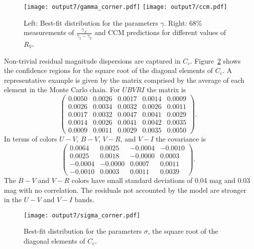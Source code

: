 \documentclass[11pt, oneside]{article}   	%
\begin{document}
\begin{figure}[htbp] %
   \centering
   \texttt{[image: output7/gamma\_corner.pdf]} 
   \texttt{[image: output7/ccm.pdf]} 
   \caption{Left: Best-fit distribution for the parameters $\gamma$.  Right: 68\% measurements of $\frac{\gamma_X}{\gamma_1-\gamma_2}$ and CCM
   predictions for different values of $R_V$.}
   \label{gamma:fig}
\end{figure}

Non-trivial residual magnitude dispersions are captured in $C_c$.   Figure~\ref{sigma:fig} shows the confidence regions for the
square root of the diagonal elements of $C_c$.
A representative example is given by the matrix comprised by the average of each element in the Monte Carlo chain.
For $UBVRI$ the matrix is
\begin{equation}
\begin{pmatrix}
0.0050 & 0.0026 & 0.0017 & 0.0014 & 0.0009 \\
0.0026 & 0.0034 & 0.0032 & 0.0026 & 0.0011 \\
0.0017 & 0.0032 & 0.0047 & 0.0041 & 0.0029 \\
0.0014 & 0.0026 & 0.0041 & 0.0042 & 0.0035 \\
0.0009 & 0.0011 & 0.0029 & 0.0035 & 0.0050
 \end{pmatrix}.
 \end{equation}
 In terms of colors $U-V$, $B-V$, $V-R$, and $V-I$ the covariance is
\begin{equation}
\begin{pmatrix}
0.0064 & 0.0025 & -0.0004 & -0.0010 \\
0.0025 & 0.0018 & -0.0000 & 0.0003 \\
-0.0004 & -0.0000 & 0.0007 & 0.0011 \\
-0.0010 & 0.0003 & 0.0011 & 0.0039
  \end{pmatrix}.
 \end{equation}
 The $B-V$ and $V-R$ colors have small standard deviations of  0.04 mag and 0.03 mag with no correlation.  The
 residuals not accounted by the
 model are stronger in the $U-V$ and $V-I$ bands.
 
 \begin{figure}[htbp] %
   \centering
   \texttt{[image: output7/sigma\_corner.pdf]} 
   \caption{Best-fit distribution for the parameters $\sigma$, the square root of the diagonal elements of $C_c$.}
   \label{sigma:fig}
\end{figure}
\end{document}
